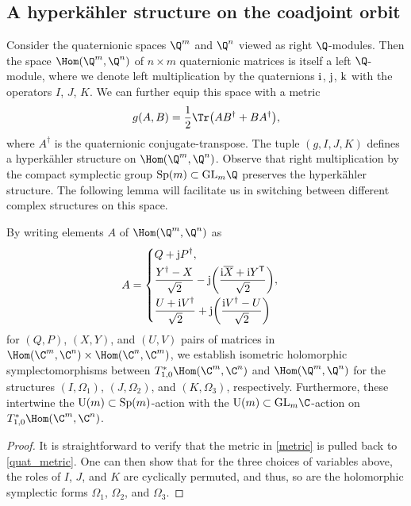 \subsection{A hyperk\"{a}hler structure on the coadjoint orbit}
Consider the quaternionic spaces $\Q^m$ and $\Q^n$ viewed as right $\Q$-modules. Then the space $\Hom(\Q^m,\Q^n)$ of $n\times m$ quaternionic matrices is itself a left $\Q$-module, where we denote left multiplication by the quaternions ${\rm i}$, ${\rm j}$, ${\rm k}$
with the operators $I$, $J$, $K$. We can further equip this space with a metric%
\begin{equation}\label{quat_metric}
	g(A,B)=\frac{1}{2}\Tr\bigl(AB^\dagger+BA^\dagger\bigr),
\end{equation}
where $A^\dagger$ is the quaternionic conjugate-transpose. The tuple $(g,I,J,K)$ defines a hyperk\"{a}hler structure on $\Hom(\Q^m,\Q^n)$.
Observe that right multiplication by the compact symplectic group ${\rm Sp}(m)\subset {\rm GL}_m\Q$ preserves the hyperk\"{a}hler structure. The following lemma will facilitate us in switching between different complex structures on this space.
\begin{Lemma}\label{facilitate}
	By writing elements $A$ of $\Hom(\Q^m,\Q^n)$ as
	\begin{equation*}
		A=\begin{cases}
			\displaystyle Q+{\rm j}P^\dagger,\\[1mm]
			\displaystyle\frac{Y^\dagger-X}{\sqrt{2}}-{\rm j}\biggl(\frac{{\rm i}\overline{X}+{\rm i}Y^{\mathsf{T}}}{\sqrt{2}}\biggr),\vspace{1mm}\\
			\displaystyle\frac{U+{\rm i}V^\dagger}{\sqrt{2}}+{\rm j}\biggl(\frac{{\rm i}V^\dagger-U}{\sqrt{2}}\biggr)
		\end{cases}
	\end{equation*}
	for $(Q,P)$, $(X,Y)$, and $(U,V)$ pairs of matrices in $\Hom(\C^m,\C^n)\times\Hom(\C^n,\C^m)$, we establish isometric holomorphic symplectomorphisms between $T^*_{1,0}\Hom(\C^m,\C^n)$ and $\Hom(\Q^m,\Q^n)$ for the structures $(I,\Omega_1)$, $(J,\Omega_2)$, and $(K,\Omega_3)$, respectively. Furthermore, these intertwine the ${\rm U}(m)\subset {\rm Sp}(m)$-action with the ${\rm U}(m)\subset {\rm GL}_m\C$-action on $T^*_{1,0}\Hom(\C^m,\C^n)$.
\end{Lemma}
\begin{proof}
	It is straightforward to verify that the metric in \eqref{metric} is pulled back to \eqref{quat_metric}. One can then show that for the three choices of variables above, the roles of $I$, $J$, and $K$ are cyclically permuted, and thus, so are the holomorphic symplectic forms $\Omega_1$, $\Omega_2$, and $\Omega_3$.
\end{proof}

